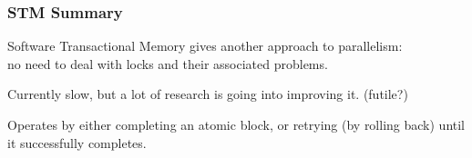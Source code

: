 \begin{frame}
  \frametitle{STM Summary}


     Software Transactional Memory gives another approach to
      parallelism: \\ \qquad no need to deal with locks and their associated problems.

     Currently slow, but a lot of research is going into improving it. (futile?)

     Operates by either completing an atomic block, or retrying (by rolling
      back) until it successfully completes.

\end{frame}




